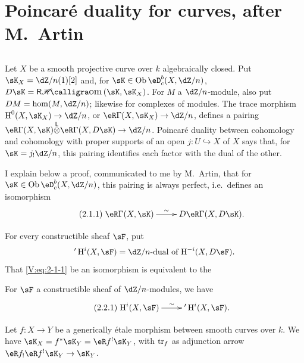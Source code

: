\section{Poincar\'e duality for curves, after M.\ Artin}\label{V:2}




\subsection{}\label{V:2-1}

Let $X$ be a smooth projective curve over $k$ algebraically closed. Put
$\sK_X=\dZ/n(1)[2]$ and, for $\sK\in\ob \eD_c^b(X,\dZ/n)$,
$D\sK=\rHom(\sK,\sK_X)$. For $M$ a $\dZ/n$-module, also put
$D M = \hom(M,\dZ/n)$; likewise for complexes of modules. The trace
morphism $\h^0(X,\sK_X) \to \dZ/n$, or $\eR\Gamma(X,\sK_X)\to \dZ/n$, defines a
pairing $\eR\Gamma(X,\sK)\lotimes\eR\Gamma(X,D\sK) \to \dZ/n$. Poincar\'e
duality between cohomology and cohomology with proper supports of an open
$j:U\hookrightarrow X$ of $X$ says that, for $\sK=j_!\dZ/n$, this pairing
identifies each factor with the dual of the other.

I explain below a proof, communicated to me by
M.\ Artin, that for $\sK\in\ob\eD_c^b(X,\dZ/n)$, this pairing is
always perfect, i.e.\ defines an isomorphism
\begin{equation*}\tag{2.1.1}\label{V:eq:2-1-1}
\xymatrix{
  \eR\Gamma(X,\sK) \ar[r]^-\sim
    & D \eR\Gamma(X,D\sK) \text{.}
}
\end{equation*}

For every constructible sheaf $\sF$, put
\[
  '\h^i(X,\sF) = \text{$\dZ/n$-dual of $\h^{-i}(X,D\sF)$.}
\]
That \eqref{V:eq:2-1-1} be an isomorphism is equivalent to the




\begin{theorem_}\label{V:2-2}
For $\sF$ a constructible sheaf of $\dZ/n$-modules, we have
\begin{equation*}\tag{2.2.1}\label{V:eq:2-2-1}
\xymatrix{
  \h^i(X,\sF) \ar[r]^-\sim
    & '\h^i(X,\sF) \text{.}
}
\end{equation*}
\end{theorem_}




\begin{lemma_}\label{V:2-3}
Let $f:X\to Y$ be a generically \'etale morphism between smooth curves over
$k$. We have $\sK_X=f^\ast\sK_Y=\eR f^!\sK_Y$, with $\operatorname{tr}_f$ as
adjunction arrow $\eR f_!\eR f^!\sK_Y\to \sK_Y$.
\end{lemma_}


